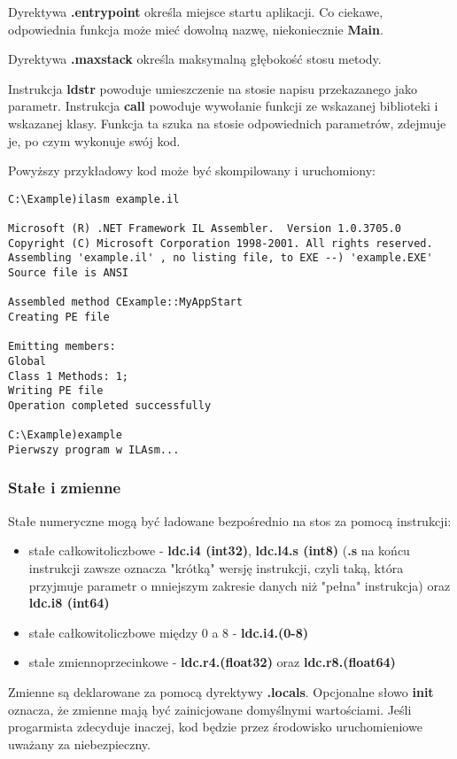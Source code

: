 Dyrektywa {\bf .entrypoint} określa miejsce startu aplikacji. Co ciekawe, odpowiednia funkcja może
mieć dowolną nazwę, niekoniecznie {\bf Main}.

Dyrektywa {\bf .maxstack} określa maksymalną głębokość stosu metody.

Instrukcja {\bf ldstr} powoduje umieszczenie na stosie napisu przekazanego jako parametr. Instrukcja
{\bf call} powoduje wywołanie funkcji ze wskazanej biblioteki i wskazanej klasy. Funkcja ta
szuka na stosie odpowiednich parametrów, zdejmuje je, po czym wykonuje swój kod.

Powyższy przykładowy kod może być skompilowany i uruchomiony:

\begin{scriptsize}
\begin{verbatim}
C:\Example)ilasm example.il

Microsoft (R) .NET Framework IL Assembler.  Version 1.0.3705.0
Copyright (C) Microsoft Corporation 1998-2001. All rights reserved.
Assembling 'example.il' , no listing file, to EXE --) 'example.EXE'
Source file is ANSI

Assembled method CExample::MyAppStart
Creating PE file

Emitting members:
Global
Class 1 Methods: 1;
Writing PE file
Operation completed successfully

C:\Example)example
Pierwszy program w ILAsm...
\end{verbatim}
\end{scriptsize}

\subsubsection{Stałe i zmienne}

Stałe numeryczne mogą być ładowane bezpośrednio na stos za pomocą instrukcji:
\begin{itemize}
\item stałe całkowitoliczbowe - {\bf ldc.i4 (int32)}, {\bf ldc.l4.s (int8)} ({\bf .s} na końcu instrukcji
zawsze oznacza "krótką" wersję instrukcji, czyli taką, która przyjmuje parametr o mniejszym zakresie danych
niż "pełna" instrukcja) oraz {\bf ldc.i8 (int64)}
\item stałe całkowitoliczbowe między 0 a 8 - {\bf ldc.i4.(0-8)}
\item stałe zmiennoprzecinkowe - {\bf ldc.r4.(float32)} oraz {\bf ldc.r8.(float64)}
\end{itemize}

Zmienne są deklarowane za pomocą dyrektywy {\bf .locals}. Opcjonalne słowo {\bf init} oznacza, że
zmienne mają być zainicjowane domyślnymi wartościami. Jeśli progarmista zdecyduje inaczej, kod będzie
przez środowisko uruchomieniowe uważany za niebezpieczny.

